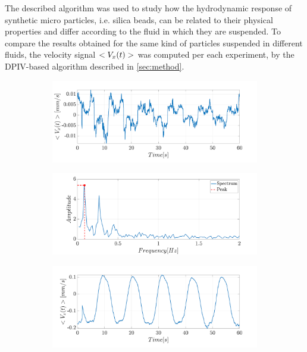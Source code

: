 \documentclass[journal]{IEEEtran}
\theoremstyle{definition}
\theoremstyle{remark}
\begin{document}
The described algorithm  was used to study how the hydrodynamic response of synthetic micro particles, i.e. silica beads, can be related to their physical properties and differ according to the fluid in which they are suspended. To compare the results obtained for the same kind of particles suspended in different fluids, the velocity signal $<V_{x}(t)>$ was computed per each experiment, by the DPIV-based algorithm described in \sect\ref{sec:method}.

\begin{figure}[t]
\centering
    \begin{subfigure}[b]{\columnwidth}
    \centering
	\includegraphics[width=1\columnwidth]{images/BeadsA}
	\caption{}
	\label{A}
    \end{subfigure}
    \begin{subfigure}[b]{\columnwidth}
	\centering
	\includegraphics[width=1\columnwidth]{images/BeadsB}
	\caption{}
	\label{B}
    \end{subfigure}
    \begin{subfigure}[b]{\columnwidth}
	\centering
	\includegraphics[width=1\columnwidth]{images/BeadsC}

\end{subfigure}
\end{figure}
\end{document}
